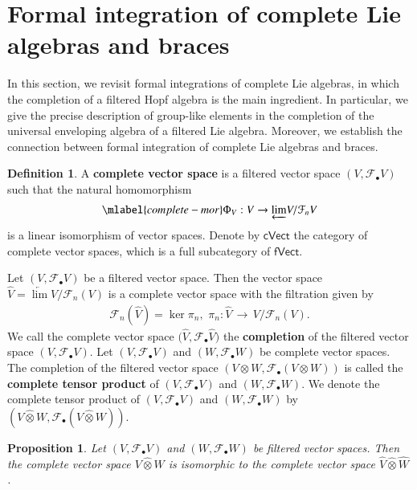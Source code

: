\documentclass[12pt]{amsart}
\newtheorem{pro}[thm]{Proposition}
\theoremstyle{definition}   %
\newtheorem{defi}[thm]{Definition}
\newcommand{\lon }{\,\rightarrow\,}
\newcommand{\huaF}{\mathcal{F}}
\newcommand{\fVec}{\mathsf{fVect}}
\newcommand{\cVec}{\mathsf{cVect}}
\begin{document}
\section{Formal integration of complete Lie algebras and braces}\label{sec:intLie}

In this section, we revisit formal integrations of complete Lie algebras, in which the completion of a filtered Hopf algebra is the main ingredient. In particular, we give the precise description of group-like elements in the completion of the universal enveloping algebra of a filtered Lie algebra. Moreover, we establish the connection between formal integration of complete Lie algebras and braces.

\begin{defi} 
A {\bf   complete vector space} is a filtered vector space $(V,\huaF_{\bullet}V)$ such that the natural homomorphism
\vspace{-.2cm}
\begin{eqnarray}\mlabel{complete-mor}
\Phi_V:V\to \underleftarrow{\lim}V/\huaF_n V
\end{eqnarray}
is a linear isomorphism of vector spaces. Denote by  $\cVec$ the category of complete vector spaces,
which is a full subcategory of $\fVec$.
\end{defi}

Let $(V,\huaF_{\bullet}V)$ be a filtered vector space. Then the vector space $\widehat{V}=\underleftarrow{\lim}V/\huaF_n (V)$ is a complete vector space with the filtration given by
\begin{eqnarray}
\huaF_n(\widehat{V})=\ker \pi_n,\,\,\pi_n:\widehat{V}\lon V/\huaF_n (V).
\end{eqnarray}
We call the complete vector space $\big(\widehat{V},\huaF_\bullet\widehat{V}\big)$ the {\bf completion} of the filtered vector space $(V,\huaF_{\bullet}V)$.
Let $(V,\huaF_{\bullet}V)$ and $(W,\huaF_{\bullet}W)$ be complete vector spaces. The completion of the filtered vector space $(V\otimes W,\huaF_{\bullet}(V\otimes W))$ is called the {\bf complete tensor product} of $(V,\huaF_{\bullet}V)$ and $(W,\huaF_{\bullet}W)$.
We denote the complete tensor product of $(V,\huaF_{\bullet}V)$ and $(W,\huaF_{\bullet}W)$ by $(V\hat{\otimes}W,\huaF_{\bullet}(V\hat{\otimes}W))$.

\begin{pro}{\rm \cite[Proposition 7.3.11]{Fr}}\label{iso-cv}
Let $(V,\huaF_{\bullet}V)$ and $(W,\huaF_{\bullet}W)$ be filtered vector spaces. Then the  complete vector space $V{\hat{\otimes}}W$ is isomorphic to the  complete vector space $\widehat{V}\hat{\otimes}\widehat{W}$.
\end{pro}
\end{document}
